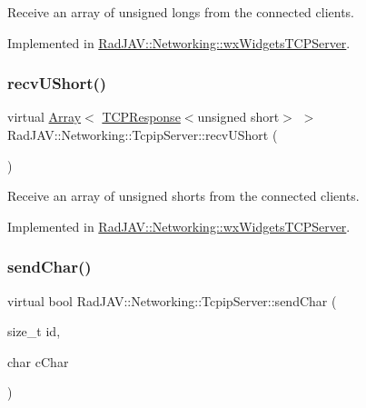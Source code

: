 Receive an array of unsigned longs from the connected clients. 



Implemented in \mbox{\hyperlink{class_rad_j_a_v_1_1_networking_1_1wx_widgets_t_c_p_server_aaa637832eee7760b0f4188caca5bf0c1}{Rad\+J\+A\+V\+::\+Networking\+::wx\+Widgets\+T\+C\+P\+Server}}.

\mbox{\label{class_rad_j_a_v_1_1_networking_1_1_tcpip_server_aa6c287a4837db82dc965bd004b6d5c7c}} 
\subsubsection{\texorpdfstring{recv\+U\+Short()}{recvUShort()}}
{\footnotesize\ttfamily virtual \mbox{\hyperlink{class_rad_j_a_v_1_1_array}{Array}}$<$ \mbox{\hyperlink{class_rad_j_a_v_1_1_networking_1_1_t_c_p_response}{T\+C\+P\+Response}}$<$unsigned short$>$ $>$ Rad\+J\+A\+V\+::\+Networking\+::\+Tcpip\+Server\+::recv\+U\+Short (\begin{DoxyParamCaption}{ }\end{DoxyParamCaption})\hspace{0.3cm}{\ttfamily [pure virtual]}}



Receive an array of unsigned shorts from the connected clients. 



Implemented in \mbox{\hyperlink{class_rad_j_a_v_1_1_networking_1_1wx_widgets_t_c_p_server_a2945c9a822fb11575ad3379e2be83a32}{Rad\+J\+A\+V\+::\+Networking\+::wx\+Widgets\+T\+C\+P\+Server}}.

\mbox{\label{class_rad_j_a_v_1_1_networking_1_1_tcpip_server_a33e4e498ee3e4425cf3b550bf5c9da4f}} 
\subsubsection{\texorpdfstring{send\+Char()}{sendChar()}}
{\footnotesize\ttfamily virtual bool Rad\+J\+A\+V\+::\+Networking\+::\+Tcpip\+Server\+::send\+Char (\begin{DoxyParamCaption}\item[{size\+\_\+t}]{id,  }\item[{char}]{c\+Char }\end{DoxyParamCaption})\hspace{0.3cm}{\ttfamily [pure virtual]}}

